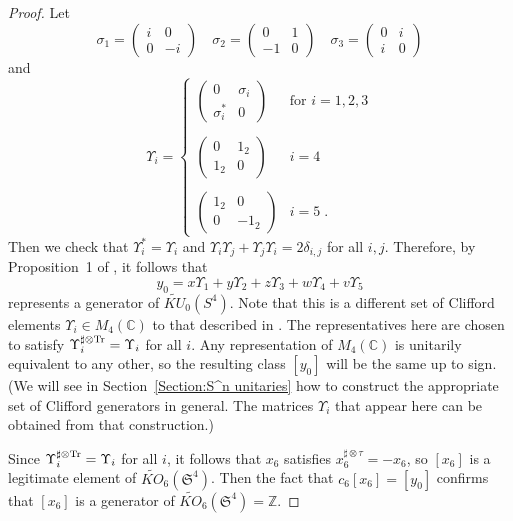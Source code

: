 \documentclass[12pt, reqno]{amsart}
\theoremstyle{definition}
\def\C{{\mathbb C}}
\def\Z{{\mathbb Z}}
\def\Up{{\Upsilon}}
\newcommand{\fS}{\mathfrak S}
\begin{document}
\begin{proof}
Let 
$$\sigma_1 = \begin{pmatrix} i & 0 \\ 0 & -i \end{pmatrix}
\quad \sigma_2 = \begin{pmatrix} 0 & 1 \\ -1 & 0 \end{pmatrix}
\quad \sigma_3 = \begin{pmatrix} 0 & i \\ i & 0 \end{pmatrix}
$$
and
$$
\Up_i = \begin{cases} \begin{pmatrix} 0 & \sigma_i \\ \sigma_i^* & 0 \end{pmatrix} & \text{for $i = 1,2,3$} \\ ~ \\
 \begin{pmatrix} 0 & 1_2 \\ 1_2 & 0 \end{pmatrix} & i = 4 \\ ~ \\
 \begin{pmatrix}  1_2 & 0  \\ 0 & -1_2  \end{pmatrix} & i = 5 \; .
\end{cases}$$
Then we check that $\Up_i^* = \Up_i$ and $\Up_i \Up_j + \Up_j \Up_i = 2 \delta_{i,j}$ for all $i,j$. Therefore, by Proposition~1 of \cite{SBS}, it follows that
$$y_0 = x \Up_1 + y \Up_2 + z \Up_3 + w \Up_4 + v \Up_5$$
represents a generator of $\widetilde{KU}_0(S^4)$. Note that this is a different set of Clifford elements $\Up_i \in M_4(\C)$ to that described in \cite{SBS}. The representatives here are chosen to satisfy $\Up_i^{\sharp \otimes {\rm{Tr}}} = \Up_i$ for all $i$. 
 Any representation of $M_4(\C)$ is unitarily equivalent to any other, so the resulting class $[y_0]$ will be the same up to sign.
 (We will see in Section~\ref{Section:S^n unitaries} how to construct the appropriate set of Clifford generators in general. The matrices $\Up_i$ that appear here can be obtained from that construction.)

Since $\Up_i^{\sharp \otimes {\rm{Tr}}} = \Up_i$ for all $i$, it follows that
$x_6$ satisfies $x_6^{\sharp \otimes \tau} = - x_6$, so $[x_6]$ is a legitimate element of $\widetilde{KO}_6(\fS^4)$. Then the fact that $c_6[x_6] = [y_0]$ confirms that $[x_6]$ is a generator of $\widetilde{KO}_6(\fS^4) = \Z$.


\end{proof}
\end{document}
